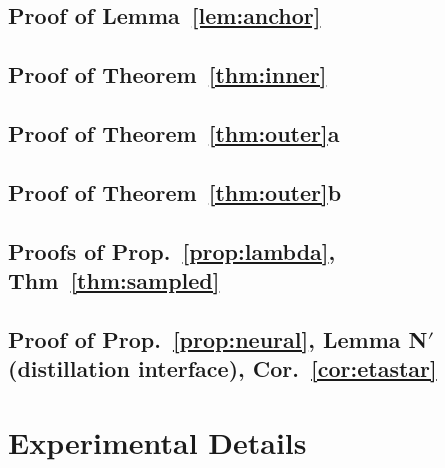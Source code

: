 \documentclass{article}
\begin{document}
\subsection{Proof of Lemma~\ref{lem:anchor}}   %
\subsection{Proof of Theorem~\ref{thm:inner}}  %
\subsection{Proof of Theorem~\ref{thm:outer}a} %
\subsection{Proof of Theorem~\ref{thm:outer}b} %
\subsection{Proofs of Prop.~\ref{prop:lambda}, Thm~\ref{thm:sampled}} %
\subsection{Proof of Prop.~\ref{prop:neural}, Lemma N$'$ (distillation
interface), Cor.~\ref{cor:etastar}} %
\section{Experimental Details}
\end{document}
